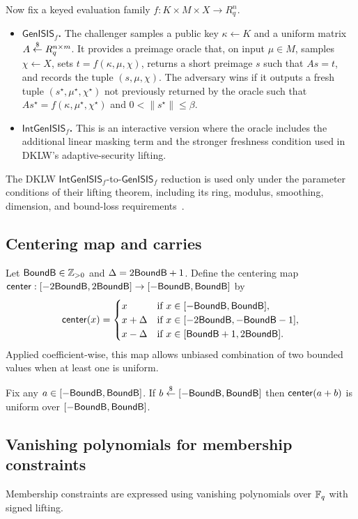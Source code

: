 Now fix a keyed evaluation family \(f:K\times M\times X\to R_q^n\).
\begin{itemize}[leftmargin=1.25em]
  \item \textbf{\(\mathsf{GenISIS}_f\).} The challenger samples a public key \(\kappa\gets K\) and a uniform matrix
  \(A\overset{\$}{\leftarrow} R_q^{n\times m}\). It provides a preimage oracle that, on input \(\mu\in M\), samples \(\chi\gets X\),
  sets \(t=f(\kappa,\mu,\chi)\), returns a short preimage \(s\) such that \(As=t\), and records the tuple
  \((s,\mu,\chi)\). The adversary wins if it outputs a fresh tuple \((s^\star,\mu^\star,\chi^\star)\) not previously
  returned by the oracle such that \(As^\star=f(\kappa,\mu^\star,\chi^\star)\) and \(0<\|s^\star\|\le \beta\).
  \item \textbf{\(\mathsf{IntGenISIS}_f\).} This is an interactive version where the oracle includes the additional
  linear masking term and the stronger freshness condition used in DKLW's adaptive-security lifting.
\end{itemize}
The DKLW \(\mathsf{IntGenISIS}_f\)-to-\(\mathsf{GenISIS}_f\) reduction is used only under the parameter
conditions of their lifting theorem, including its ring, modulus, smoothing, dimension, and bound-loss
requirements~\cite[Theorem~6]{EPRINT:DKLW25}.


\subsection{Centering map and carries}
Let \(\mathsf{BoundB}\in\mathbb{Z}_{>0}\) and \(\Delta=2\mathsf{BoundB}+1\). Define the centering map
\(\mathsf{center}:[-2\mathsf{BoundB},2\mathsf{BoundB}]\to[-\mathsf{BoundB},\mathsf{BoundB}]\) by
\[
\mathsf{center}(x)=
\begin{cases}
x & \text{if } x\in[-\mathsf{BoundB},\mathsf{BoundB}],\\
x+\Delta & \text{if } x\in[-2\mathsf{BoundB},-\mathsf{BoundB}-1],\\
x-\Delta & \text{if } x\in[\mathsf{BoundB}+1,2\mathsf{BoundB}].
\end{cases}
\]
Applied coefficient-wise, this map allows unbiased combination of two bounded values when at least one is uniform.

\begin{lemma}\label{lem:center-uniform-app}
Fix any \(a\in[-\mathsf{BoundB},\mathsf{BoundB}]\). If \(b\overset{\$}{\leftarrow} [-\mathsf{BoundB},\mathsf{BoundB}]\) then \(\mathsf{center}(a+b)\) is uniform over
\([-\mathsf{BoundB},\mathsf{BoundB}]\).
\end{lemma}

\subsection{Vanishing polynomials for membership constraints}
Membership constraints are expressed using vanishing polynomials over \(\mathbb{F}_q\) with signed lifting.

